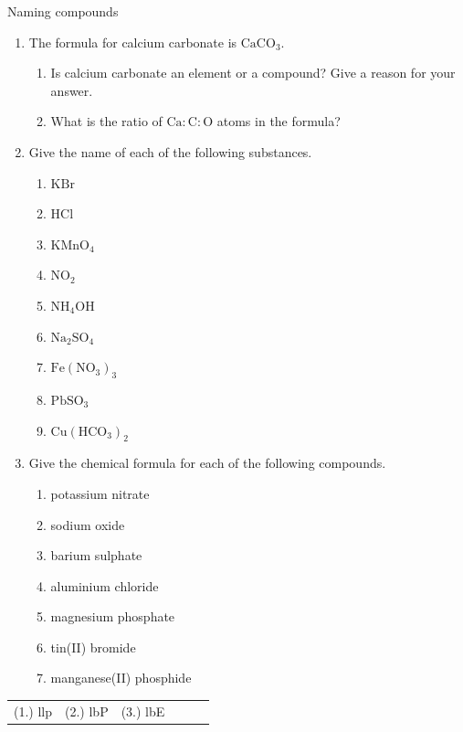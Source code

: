   \label{m38708*secfhsst!!!underscore!!!id255}
            \begin{exercises}{Naming compounds}
{            \nopagebreak \noindent \vspace{-1cm}
      \label{m38708*id65118}\begin{enumerate}[noitemsep, label=\textbf{\arabic*}. ] 
\item The formula for calcium carbonate is $\text{CaCO}{}_{3}$.
 \begin{enumerate}[noitemsep, label=\textbf{\alph*}. ] 
\item Is calcium carbonate an element or a compound? Give a reason for your answer.
\item What is the ratio of $\text{Ca}:\text{C}:\text{O}$ atoms in the formula?
\end{enumerate}
\item Give the name of each of the following substances.
\begin{multicols}{3}
\begin{enumerate}[noitemsep, label=\textbf{\alph*}. ]
\item $\text{KBr}$
\item $\text{HCl}$ 
\item ${\text{KMnO}}_{4}$
\item ${\text{NO}}_{2}$ 
\item ${\text{NH}}_{4}\text{OH}$ 
\item ${\text{Na}}_{2}{\text{SO}}_{4}$
\item ${\text{Fe}}({\text{NO}}_{3})_3$
\item ${\text{Pb}}{\text{SO}}_{3}$
\item ${\text{Cu}}({\text{HCO}}_{3})_2$ 
\end{enumerate}
\end{multicols}
\item Give the chemical formula for each of the following compounds.
\begin{multicols}{2}
\begin{enumerate}[noitemsep, label=\textbf{\alph*}. ]
\item potassium nitrate
\item sodium oxide
\item barium sulphate 
\item aluminium chloride
\item magnesium phosphate 
\item tin(II) bromide
\item manganese(II) phosphide
\end{enumerate}
\end{multicols}
\end{enumerate}
\practiceinfo
    \label{m38708*cid5}
\par 
 \par \begin{tabular}[h]{cccccc}
 (1.) llp  &  (2.) lbP  &  (3.) lbE   & & \end{tabular}}
\end{exercises}
